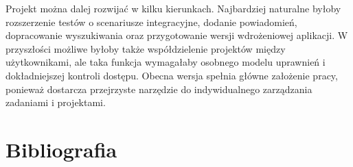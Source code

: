 \documentclass[12pt,a4paper,twoside]{report}
\begin{document}
Projekt można dalej rozwijać w kilku kierunkach. Najbardziej naturalne byłoby rozszerzenie testów o scenariusze integracyjne, dodanie powiadomień, dopracowanie wyszukiwania oraz przygotowanie wersji wdrożeniowej aplikacji. W przyszłości możliwe byłoby także współdzielenie projektów między użytkownikami, ale taka funkcja wymagałaby osobnego modelu uprawnień i dokładniejszej kontroli dostępu. Obecna wersja spełnia główne założenie pracy, ponieważ dostarcza przejrzyste narzędzie do indywidualnego zarządzania zadaniami i projektami.

\chapter*{Bibliografia}
\begingroup
\sloppy
\end{document}
